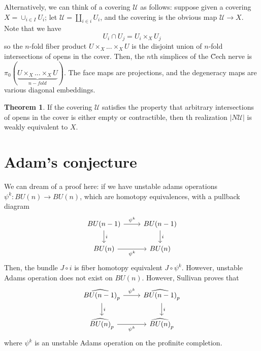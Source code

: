\documentclass{article}
\theoremstyle{definition}
\newtheorem{theorem}{Theorem}[section]
\theoremstyle{definition}
\theoremstyle{definition}
\theoremstyle{definition}
\theoremstyle{definition}
\theoremstyle{definition}
\theoremstyle{definition}
\begin{document}
Alternatively, we can think of a covering $\mathcal{U}$ as follows: suppose given a covering $X=\cup_{i\in I}U_i$; let $\mathcal{U}=\coprod_{i\in i} U_i$, and the covering is the obvious map $\mathcal{U}\to X$. Note that we have 
\[U_i\cap U_j=U_i\times_X U_j\]
so the $n$-fold fiber product $U\times_X...\times_X U$ is the disjoint union of $n$-fold intersections of opens in the cover. Then, the $n$th simplices of the \u Cech nerve is $\pi_0(  \underbrace{U\times_X...\times_X U }_{n-fold})$. The face maps are projections, and the degeneracy maps are various diagonal embeddings.


\begin{tcolorbox}[colback=red!5!white,colframe=red!30!white]
\begin{theorem}
If the covering $\mathcal{U}$ satisfies the property that arbitrary intersections of opens in the cover is either empty or contractible, then th realization $|N \mathcal{U}|$ is weakly equivalent to $X$.
\end{theorem}
\end{tcolorbox}


\section{Adam's conjecture}




We can dream of a proof here: if we have unstable adams operations $\psi^k: BU(n)\to BU(n)$, which are homotopy equivalences, with a pullback diagram
\[\begin{tikzcd}
	{BU(n-1)} & {BU(n-1)} \\
	{BU(n)} & {BU(n)}
	\arrow["{\psi^k}", from=1-1, to=1-2]
	\arrow["i", from=1-1, to=2-1]
	\arrow["i", from=1-2, to=2-2]
	\arrow["{\psi^k}"', from=2-1, to=2-2]
\end{tikzcd}\]
Then, the bundle $J\circ i$ is fiber homotopy equivalent $J\circ \psi^k$. However, unstable Adams operation does not exist on $BU(n)$. However, Sullivan proves that 
\[\begin{tikzcd}
	{\widehat{BU(n-1)}_p} & {\widehat{BU(n-1)}_p} \\
	{\widehat{BU(n)}_p} & {\widehat{BU(n)}_p}
	\arrow["{\psi^k}", from=1-1, to=1-2]
	\arrow["i", from=1-1, to=2-1]
	\arrow["i", from=1-2, to=2-2]
	\arrow["{\psi^k}"', from=2-1, to=2-2]
\end{tikzcd}\]
where $\psi^k$ is an unstable Adams operation on the profinite completion. 
\end{document}
